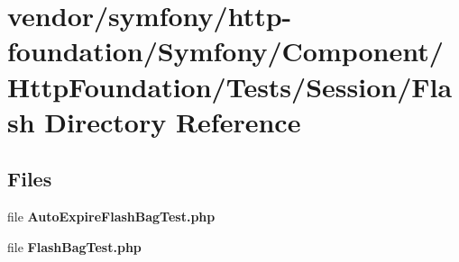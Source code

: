 \section{vendor/symfony/http-\/foundation/\+Symfony/\+Component/\+Http\+Foundation/\+Tests/\+Session/\+Flash Directory Reference}
\label{dir_1c1789cd3a562e19d996179579bc9061}
\subsection*{Files}
\begin{DoxyCompactItemize}
\item 
file {\bf Auto\+Expire\+Flash\+Bag\+Test.\+php}
\item 
file {\bf Flash\+Bag\+Test.\+php}
\end{DoxyCompactItemize}
